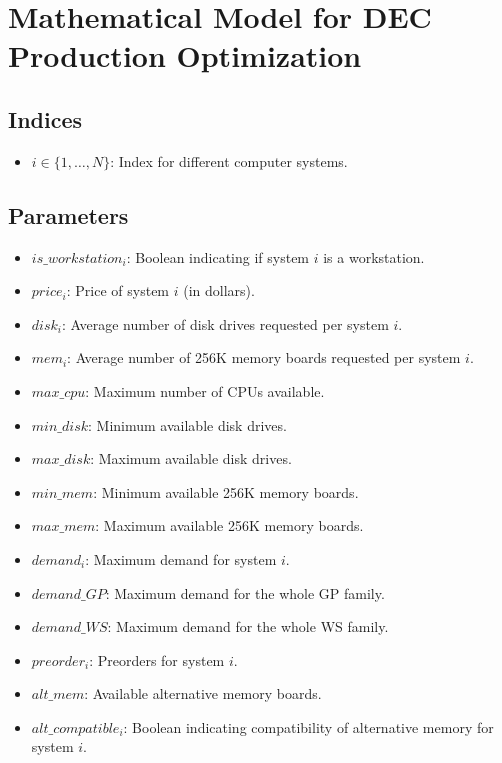 \documentclass{article}
\begin{document}
\section*{Mathematical Model for DEC Production Optimization}

\subsection*{Indices}
\begin{itemize}
    \item $i \in \{1, \ldots, N\}$: Index for different computer systems.
\end{itemize}

\subsection*{Parameters}
\begin{itemize}
    \item $is\_workstation_i$: Boolean indicating if system $i$ is a workstation.
    \item $price_i$: Price of system $i$ (in dollars).
    \item $disk_i$: Average number of disk drives requested per system $i$.
    \item $mem_i$: Average number of 256K memory boards requested per system $i$.
    \item $max\_cpu$: Maximum number of CPUs available.
    \item $min\_disk$: Minimum available disk drives.
    \item $max\_disk$: Maximum available disk drives.
    \item $min\_mem$: Minimum available 256K memory boards.
    \item $max\_mem$: Maximum available 256K memory boards.
    \item $demand_i$: Maximum demand for system $i$.
    \item $demand\_GP$: Maximum demand for the whole GP family.
    \item $demand\_WS$: Maximum demand for the whole WS family.
    \item $preorder_i$: Preorders for system $i$.
    \item $alt\_mem$: Available alternative memory boards.
    \item $alt\_compatible_i$: Boolean indicating compatibility of alternative memory for system $i$.
\end{itemize}
\end{document}
